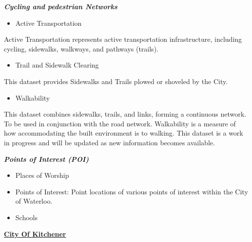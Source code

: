 \documentclass[12pt,twoside]{reedthesis}
\providecommand{\tightlist}{%
  \setlength{\itemsep}{0pt}\setlength{\parskip}{0pt}}
\begin{document}
\textbf{\emph{Cycling and pedestrian Networks}}
\begin{itemize}
\tightlist
\item
  Active Transportation
\end{itemize}
Active Transportation represents active transportation infrastructure, including cycling, sidewalks, walkways, and pathways (trails).
\begin{itemize}
\tightlist
\item
  Trail and Sidewalk Clearing
\end{itemize}
This dataset provides Sidewalks and Trails plowed or shoveled by the City.
\begin{itemize}
\tightlist
\item
  Walkability
\end{itemize}
This dataset combines sidewalks, trails, and links, forming a continuous network. To be used in conjunction with the road network. Walkability is a measure of how accommodating the built environment is to walking. This dataset is a work in progress and will be updated as new information becomes available.

\textbf{\emph{Points of Interest (POI)}}
\begin{itemize}
\tightlist
\item
  Places of Worship
\item
  Points of Interest: Point locations of various points of interest within the City of Waterloo.
\item
  Schools
\end{itemize}
\textbf{\href{https://data.waterloo.ca/search?tags=base\%20data}{City Of Kitchener}}
\end{document}
